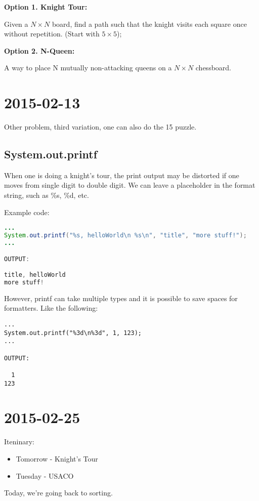 \documentclass [12 pt, twoside] {article}
\begin{document}
\textbf{Option 1. Knight Tour:}


Given a $N \times N$ board, find a path such that the knight visits
each square once without repetition. (Start with $5 \times 5$);


\textbf{Option 2. N-Queen:}


A way to place N mutually non-attacking queens on a $N \times N$ chessboard.

\section{2015-02-13}

Other problem, third variation, one can also do the 15 puzzle.

\subsection{System.out.printf}
When one is doing a knight's tour, the print output may be distorted if
one moves from single digit to double digit. We can leave a placeholder
in the format string, such as \%s, \%d, etc.


Example code:
\begin{lstlisting}[language=java]
...
System.out.printf("%s, helloWorld\n %s\n", "title", "more stuff!");
...

OUTPUT:

title, helloWorld
more stuff!
\end{lstlisting}

However, printf can take multiple types and it is possible to save spaces for
formatters. Like the following:

\begin{lstlisting}
...
System.out.printf("%3d\n%3d", 1, 123);
...

OUTPUT:

  1
123
\end{lstlisting}

\section{2015-02-25}

Iteninary:
\begin{itemize}
	\item Tomorrow - Knight's Tour
	\item Tuesday - USACO
\end{itemize}

Today, we're going back to sorting.
\end{document}

